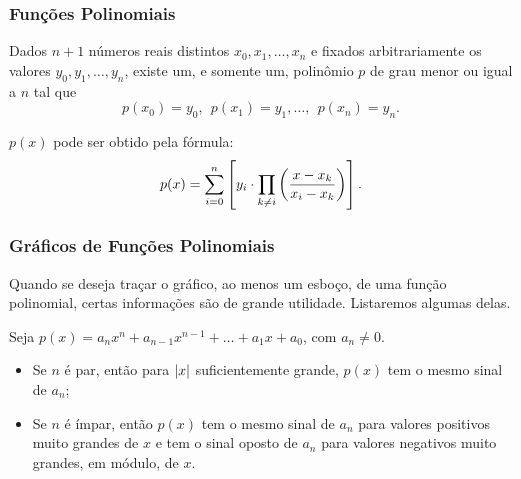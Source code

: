 \documentclass[brazil, notheorems, 10pt]{beamer}
\begin{document}

\begin{frame}
\frametitle{Funções Polinomiais} %
\begin{Prop}
Dados $n+1$ números reais distintos $x_0, x_1 , \dots , x_n$ e
fixados arbitrariamente os valores $y_0, y_1, \dots, y_n$, existe
um, e somente um, polinômio $p$ de grau menor ou igual a $n$ tal que
$$p(x_0) = y_0, \ \ p(x_1) = y_1,  \dots , \ \ p(x_n) = y_n.$$

$p(x)$ pode ser obtido pela fórmula:
$$p(x) = \sum_{i=0}^{n} \left[y_i \cdot \prod_{k \neq i} \left(\frac {x-
x_k}{x_i-x_k}\right)\right].$$
\end{Prop}

\end{frame}


\begin{frame}
\frametitle{Gráficos de Funções Polinomiais} %
Quando se deseja traçar o gráfico, ao menos um esboço, de uma função
polinomial, certas informações são de grande utilidade. Listaremos
algumas delas.

Seja $p(x) = a_n x^n+ a_{n-1} x^{n-1} + \dots + a_1x + a_0$, com
$a_n \neq 0$.
\begin{itemize}
	\item Se $n$ é par, então para $\left|x\right| $ suficientemente grande,
	$p(x)$ tem o mesmo sinal de $a_n$;
	\item Se $n$ é ímpar, então $p(x)$ tem o mesmo sinal de $a_n$ para
	valores positivos  muito grandes de $x$ e tem o sinal oposto de
	$a_n$ para valores negativos muito grandes, em módulo, de $x$.
\end{itemize}

\end{frame}
\end{document}
